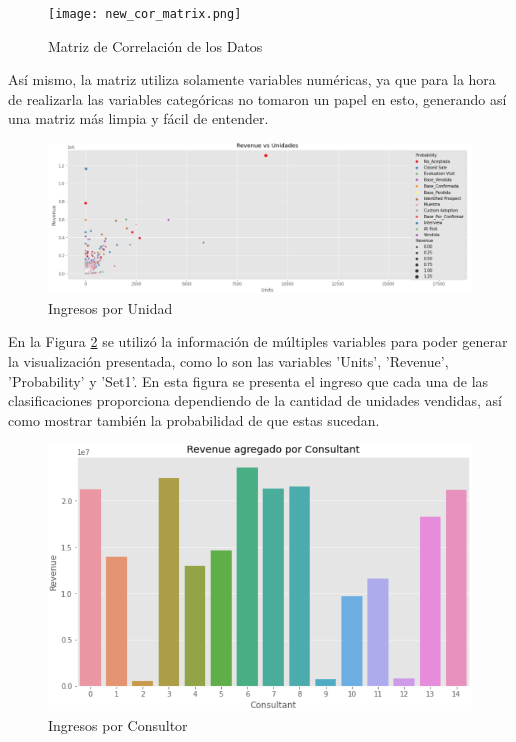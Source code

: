 \documentclass{article}
\begin{document}
        \begin{figure}[h!]
            \centering
            \texttt{[image: new\_cor\_matrix.png]}
            \caption{Matriz de Correlación de los Datos}
            \label{fig:tablaCor}
        \end{figure}
        Así mismo, la matriz utiliza solamente variables numéricas, ya que para la hora de realizarla las variables categóricas no tomaron un papel en esto, generando así una matriz más limpia y fácil de entender. 

        \newpage

        \begin{figure}[h!]
            \centering
            \includegraphics[width = \columnwidth]{Revenue vs Unit.PNG}
            \caption{Ingresos por Unidad}
            \label{fig:revUnit}
        \end{figure}

        En la Figura \ref{fig:revUnit} se utilizó la información de múltiples variables para poder generar la visualización presentada, como lo son las variables 'Units', 'Revenue', 'Probability' y 'Set1'. En esta figura se presenta el ingreso que cada una de las clasificaciones proporciona dependiendo de la cantidad de unidades vendidas, así como mostrar también la probabilidad de que estas sucedan.

        \vspace{3mm}

        \begin{figure}[h!]
            \centering
            \includegraphics[width = \columnwidth]{Revenue por Consultor.PNG}
            \caption{Ingresos por Consultor}
            \label{fig:revConsultor}
        \end{figure}
\end{document}
